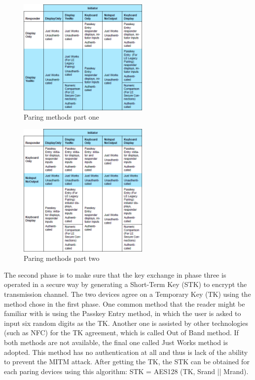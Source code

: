 \documentclass{cseminar}
\begin{document}
\begin{figure}
\centering
\includegraphics[width=2.5in]{figures/Paring_method_one.png}
\caption{Paring methods part one}
\label{Paring_method_one}
\end{figure}

\begin{figure}
\centering
\includegraphics[width=2.5in]{figures/Paring_method_two.png}
\caption{Paring methods part two}
\label{Paring_method_two}
\end{figure}

The second phase is to make sure that the key exchange in phase three is operated in a secure way by generating a Short-Term Key (STK) to encrypt the transmission channel. The two devices agree on a Temporary Key (TK) using the method chose in the first phase. One common method that the reader might be familiar with is using the Passkey Entry method, in which the user is asked to input six random digits as the TK. Another one is assisted by other technologies (such as NFC) for the TK agreement, which is called Out of Band method. If both methods are not available, the final one called Just Works method is adopted. This method has no authentication at all and thus is lack of the ability to prevent the MITM attack. After getting the TK, the STK can be obtained for each paring devices using this algorithm: STK = AES128 (TK, Srand || Mrand).
\end{document}
